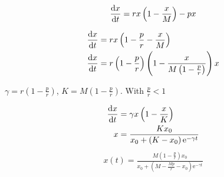 \begin{equation}
	\frac{\mathrm{d} x}{{\mathrm{d} t}}=rx\left(1-\frac{x}{M}\right)-px \label{eq: PropHarvest}
\end{equation}

\begin{align}
\frac{\mathrm{d} x}{{\mathrm{d} t}}&=rx\left(1-\frac{p}{r}-\frac{x}{M}\right) \\
\frac{\mathrm{d} x}{{\mathrm{d} t}}&=r\left(1-\frac{p}{r}\right)\left(1-\frac{x}{M\left(1-\frac{p}{r}\right)}\right)x
\end{align}

$\gamma=r\left(1-\frac{p}{r}\right)$, $K=M\left(1-\frac{p}{r}\right)$. With $\frac{p}{r}<1$

\begin{align}
	\frac{\mathrm{d} x}{{\mathrm{d} t}}&=\gamma x\left(1-\frac{x}{K}\right)\\
	x&=\frac{Kx_0}{x_0+\left(K-x_0\right)\mathrm{e}^{-\gamma t}}
\end{align}
\begin{align}
	x(t)=\frac{M\left(1-\frac{p}{r}\right)x_0}{x_0+\left(M-\frac{Mp}{r}-x_0\right)\mathrm{e}^{-\gamma t}} \label{eq: Proportional Population}
\end{align}